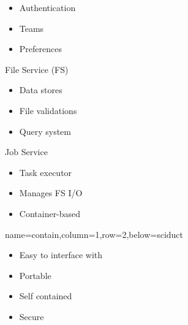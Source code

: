 \documentclass[landscape,paperwidth=70in,paperheight=46in,fontscale=0.225]{baposter} %
\begin{document}
\begin{poster}
{\begin{minipage}[t]{0.32\columnwidth}
\begin{itemize}[leftmargin=*,noitemsep,topsep=0pt]
	\item Authentication
	\item Teams
	\item Preferences
\end{itemize}
\end{minipage}
\hfill
\noindent
\begin{minipage}[t]{0.32\columnwidth}
File Service (FS)

\begin{itemize}[leftmargin=*,noitemsep,topsep=0pt]
	\item Data stores
	\item File validations
	\item Query system
\end{itemize}

\end{minipage}
\hfill
\noindent
\begin{minipage}[t]{0.32\columnwidth}
Job Service
\begin{itemize}[leftmargin=*,noitemsep,topsep=0pt]
	\item Task executor
	\item Manages FS I/O
	\item Container-based 

\end{itemize}

\end{minipage}
}


          {name=contain,column=1,row=2,below=sciduct}{
          
\begin{minipage}{.5\textwidth}
\begin{itemize}[leftmargin=*,noitemsep,topsep=0pt]
\item Easy to interface with
\item Portable
\item Self contained
\item Secure


\end{itemize}
\end{minipage}}
\end{poster}
\end{document}
